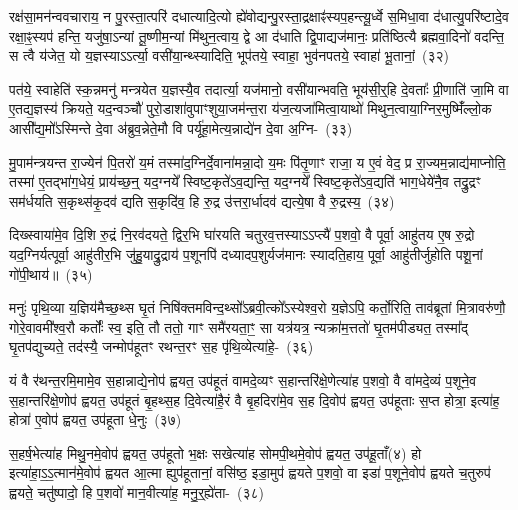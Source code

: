 रक्ष॑सा॒मन॑न्ववचाराय॒ न पु॒रस्ता॒त्परि॑ दधात्यादि॒त्यो ह्ये॑वोद्यन्पु॒रस्ता॒द्\-रक्षाꣴ॑स्यप॒हन्त्यू॒र्ध्वे स॒मिधा॒वा द॑धात्यु॒परि॑ष्टादे॒व रक्षा॒ꣴ॒स्यप॑ हन्ति॒ यजु॑षा॒\-ऽन्यां तू॒ष्णीम॒न्यां मि॑थुन॒त्वाय॒ द्वे आ द॑धाति द्वि॒पाद्यज॑मानः॒ प्रति॑ष्ठित्यै ब्रह्मवा॒दिनो॑ वदन्ति॒ स त्वै य॑जेत॒ यो य॒ज्ञस्या\-ऽऽ\-र्त्या॒ वसी॑या॒न्थ्स्यादिति॒ भूप॑तये॒ स्वाहा॒ भुव॑नपतये॒ स्वाहा॑ भू॒तानां॒~(३२)\ip

पत॑ये॒ स्वाहेति॑ स्क॒न्नमनु॑ मन्त्रयेत य॒ज्ञस्यै॒व तदार्त्या॒ यज॑मानो॒ वसी॑यान्भवति॒ भूय॑सी॒र्॒\mbox{}हि दे॒वताः᳚ प्री॒णाति॑ जा॒मि वा ए॒तद्य॒ज्ञस्य॑ क्रियते॒ यद॒न्वञ्चौ॑ पुरो॒डाशा॑वुपाꣳशुया॒जम॑\-न्त॒रा य॑ज॒त्यजा॑मित्वा॒याथो॑ मिथुन॒त्वाया॒ग्निर॒मुष्मिँ॑ल्लो॒क आसी᳚द्य॒मो᳚\-ऽस्मिन्ते दे॒वा अ॑ब्रुव॒न्नेते॒मौ वि पर्यू॑हा॒मेत्य॒न्नाद्ये॑न दे॒वा अ॒ग्नि-~(३३)\ip

मु॒पाम॑न्त्रयन्त रा॒ज्येन॑ पि॒तरो॑ य॒मं तस्मा॑द॒ग्निर्दे॒वाना॑मन्ना॒दो य॒मः पि॑तृ॒णाꣳ राजा॒ य ए॒वं वेद॒ प्र रा॒ज्यम॒न्नाद्य॑माप्नोति॒ तस्मा॑ ए॒तद्भा॑ग॒धेयं॒ प्राय॑च्छ॒न्॒ यद॒ग्नये᳚ स्विष्ट॒कृते॑\-ऽव॒द्यन्ति॒ यद॒ग्नये᳚ स्विष्ट॒कृते॑\-ऽव॒द्यति॑ भाग॒\-धेये॑नै॒व तद्रु॒द्रꣳ सम॑र्धयति स॒कृथ्स॑कृ॒दव॑ द्यति स॒कृदि॑व॒ हि रु॒द्र उ॑त्तरा॒र्धादव॑ द्यत्ये॒षा वै रु॒द्रस्य॒~(३४)\ip

दिख्स्वाया॑मे॒व दि॒शि रु॒द्रं नि॒रव॑दयते॒ द्विर॒भि घा॑रयति चतुरव॒त्तस्या\-ऽऽ\-प्त्यै॑ प॒शवो॒ वै पूर्वा॒ आहु॑तय ए॒ष रु॒द्रो यद॒ग्निर्यत्पूर्वा॒ आहु॑तीर॒भि जु॑हु॒याद्रु॒द्राय॑ प॒शूनपि॑ दध्यादप॒शुर्यज॑मानः स्यादति॒हाय॒ पूर्वा॒ आहु॑तीर्जुहोति पशू॒नां गो॑पी॒थाय॑॥~(३५)\ip

{}

मनुः॑ पृथि॒व्या य॒ज्ञिय॑मैच्छ॒थ्स घृ॒तं निषि॑क्तमविन्द॒थ्सो᳚\-ऽब्रवी॒त्को᳚\-ऽस्येश्व॒रो य॒ज्ञे\-ऽपि॒ कर्तो॒रिति॒ ताव॑ब्रूतां मि॒त्रावरु॑णौ॒ गोरे॒वावमी᳚श्व॒रौ कर्तोः᳚ स्व॒ इति॒ तौ ततो॒ गाꣳ समै॑रयता॒ꣳ॒ सा यत्र॑यत्र॒ न्यक्रा॑म॒त्ततो॑ घृ॒तम॑पीड्यत॒ तस्मा᳚द् घृ॒तप॑द्युच्यते॒ तद॑स्यै॒ जन्मोप॑हूतꣳ रथन्त॒रꣳ स॒ह पृ॑थि॒व्येत्या॑हे॒-~(३६)\ip

यं वै र॑थन्त॒रमि॒मामे॒व स॒हान्नाद्ये॒नोप॑ ह्वयत॒ उप॑हूतं वामदे॒व्यꣳ स॒हान्तरि॑क्षे॒णेत्या॑ह प॒शवो॒ वै वा॑मदे॒व्यं प॒शूने॒व स॒हान्तरि॑क्षे॒णोप॑ ह्वयत॒ उप॑हूतं बृ॒हथ्स॒ह दि॒वेत्या॑है॒रं वै बृ॒हदिरा॑मे॒व स॒ह दि॒वोप॑ ह्वयत॒ उप॑हूताः स॒प्त होत्रा॒ इत्या॑ह॒ होत्रा॑ ए॒वोप॑ ह्वयत॒ उप॑हूता धे॒नुः~(३७)\ip

स॒हर्\mbox{}ष॒भेत्या॑ह मिथु॒नमे॒वोप॑ ह्वयत॒ उप॑हूतो भ॒क्षः सखेत्या॑ह सोमपी॒थमे॒वोप॑ ह्वयत॒ उप॑हू॒ताँ(४) हो इत्या॑हा॒\-ऽ॒\-ऽ॒त्मान॑मे॒वोप॑ ह्वयत आ॒त्मा ह्युप॑हूतानां॒ वसि॑ष्ठ॒ इडा॒मुप॑ ह्वयते प॒शवो॒ वा इडा॑ प॒शूने॒वोप॑ ह्वयते च॒तुरुप॑ ह्वयते॒ चतु॑ष्पादो॒ हि प॒शवो॑ मान॒वीत्या॑ह॒ मनु॒र्॒\mbox{}ह्ये॑ता-~(३८)\ip


